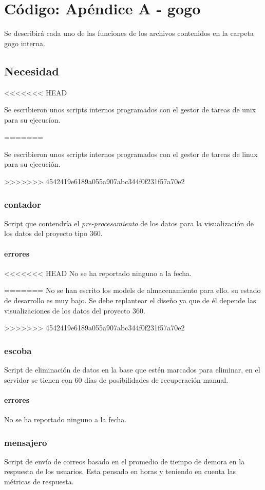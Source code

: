 \documentclass[10pt,a4paper]{book}
\begin{document}
	\chapter{Código: Apéndice A - gogo}

	Se describirá cada uno de las funciones de los archivos contenidos en la carpeta gogo interna.

	\section{Necesidad}
<<<<<<< HEAD

	Se escribieron unos scripts internos programados con el gestor de tareas de unix para su ejecucíon.

=======
	
	Se escribieron unos scripts internos programados con el gestor de tareas de linux para su ejecución.
	
>>>>>>> 4542419e6189a055a907abc344f0f231f57a70e2
	\subsection{contador}
	Script que contendría el \textit{pre-procesamiento} de los datos para la visualización de los datos del proyecto tipo 360.
	\subsubsection{errores}
<<<<<<< HEAD
	No se ha reportado ninguno a la fecha.

=======
	No se han escrito los models de almacenamiento para ello. su estado de desarrollo es muy bajo. Se debe replantear el diseño ya que de él depende las visualizaciones de los datos del proyecto 360.
	
>>>>>>> 4542419e6189a055a907abc344f0f231f57a70e2
	\subsection{escoba}
	Script de eliminación de datos en la base que estén marcados para eliminar, en el servidor se tienen con 60 días de posibilidades de recuperación manual.
	\subsubsection{errores}
	No se ha reportado ninguno a la fecha.

	\subsection{mensajero}
	Script de envío de correos basado en el promedio de tiempo de demora en la respuesta de los usuarios. Esta pensado en horas y teniendo en cuenta las métricas de respuesta.
\end{document}
